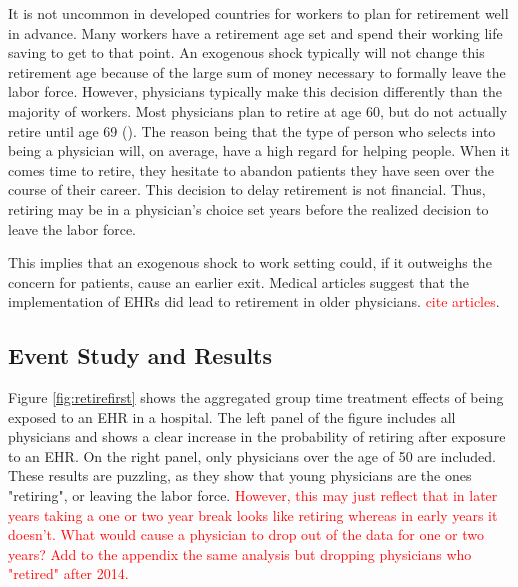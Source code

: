 \documentclass[11pt]{article}
\begin{document}
It is not uncommon in developed countries for workers to plan for retirement well in advance. Many workers have a retirement age set and spend their working life saving to get to that point. An exogenous shock typically will not change this retirement age because of the large sum of money necessary to formally leave the labor force. However, physicians typically make this decision differently than the majority of workers. Most physicians plan to retire at age 60, but do not actually retire until age 69 (\cite{collier2017challenges}). The reason being that the type of person who selects into being a physician will, on average, have a high regard for helping people. When it comes time to retire, they hesitate to abandon patients they have seen over the course of their career. This decision to delay retirement is not financial. Thus, retiring may be in a physician's choice set years before the realized decision to leave the labor force. 

This implies that an exogenous shock to work setting could, if it outweighs the concern for patients, cause an earlier exit. Medical articles suggest that the implementation of EHRs did lead to retirement in older physicians. \textcolor{red}{cite articles}. 

\subsection{Event Study and Results}

Figure \ref{fig:retirefirst} shows the aggregated group time treatment effects of being exposed to an EHR in a hospital. The left panel of the figure includes all physicians and shows a clear increase in the probability of retiring after exposure to an EHR. On the right panel, only physicians over the age of 50 are included. These results are puzzling, as they show that young physicians are the ones "retiring", or leaving the labor force. \textcolor{red}{However, this may just reflect that in later years taking a one or two year break looks like retiring whereas in early years it doesn't. What would cause a physician to drop out of the data for one or two years? Add to the appendix the same analysis but dropping physicians who "retired" after 2014. }
\end{document}
